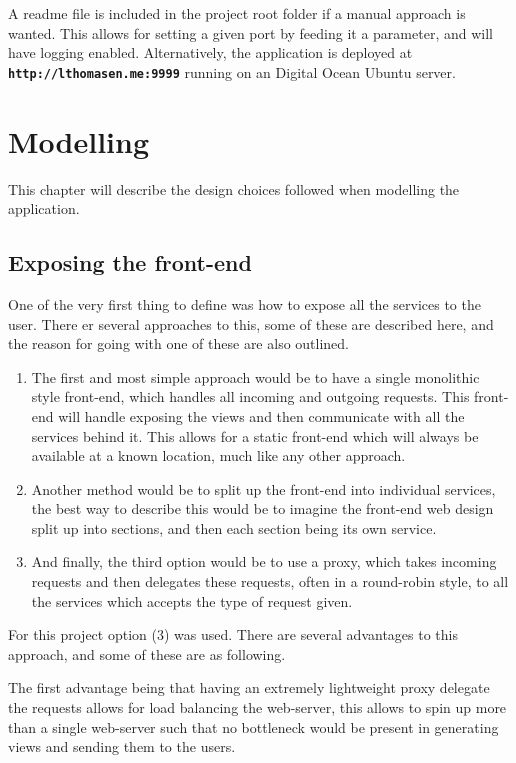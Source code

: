 \documentclass[a4paper,11pt,oneside]{book}
\begin{document}
A readme file is included in the project root folder if a manual approach is wanted. This allows for setting a given port by feeding it a parameter, and will have logging enabled. Alternatively, the application is deployed at \textbf{\texttt{http://lthomasen.me:9999}} running on an Digital Ocean Ubuntu server.

%
%
\chapter{Modelling}
This chapter will describe the design choices followed when modelling the application.

\section{Exposing the front-end}
One of the very first thing to define was how to expose all the services to the user. There er several approaches to this, some of these are described here, and the reason for going with one of these are also outlined.

\begin{enumerate}
\item The first and most simple approach would be to have a single monolithic style front-end, which handles all incoming and outgoing requests. This front-end will handle exposing the views and then communicate with all the services behind it. This allows for a static front-end which will always be available at a known location, much like any other approach.

\item Another method would be to split up the front-end into individual services, the best way to describe this would be to imagine the front-end web design split up into sections, and then each section being its own service.

\item And finally, the third option would be to use a proxy, which takes incoming requests and then delegates these requests, often in a round-robin style, to all the services which accepts the type of request given.
\end{enumerate}

For this project option (3) was used. There are several advantages to this approach, and some of these are as following.

The first advantage being that having an extremely lightweight proxy delegate the requests allows for load balancing the web-server, this allows to spin up more than a single web-server such that no bottleneck would be present in generating views and sending them to the users.
\end{document}
